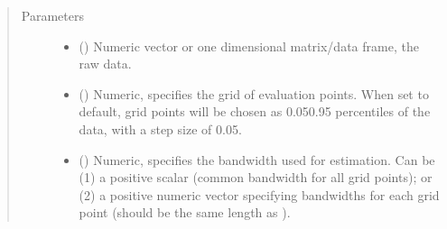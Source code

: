 \documentclass[letterpaper,10pt,english]{sphinxmanual}
\begin{document}
\begin{fulllineitems}
\label{\detokenize{lpdensity:lpdensity.lpdensity.lpdensity}}
\pysigstartsignatures
{}
\pysigstopsignatures\begin{quote}\begin{description}
\item[{Parameters}] \leavevmode\begin{itemize}
\item {} 
\sphinxAtStartPar
{} () \textendash{} Numeric vector or one dimensional matrix/data frame, the raw data.

\item {} 
\sphinxAtStartPar
{} () \textendash{} Numeric, specifies the grid of evaluation points. When set to default, grid points will be chosen as 0.05\sphinxhyphen{}0.95 percentiles of the data, with a step size of 0.05.

\item {} 
\sphinxAtStartPar
{} () \textendash{} Numeric, specifies the bandwidth used for estimation. Can be (1) a positive scalar (common bandwidth for all grid points); or (2) a positive numeric vector specifying bandwidths for each grid point (should be the same length as ).


\end{itemize}
\end{description}
\end{quote}
\end{fulllineitems}
\end{document}
